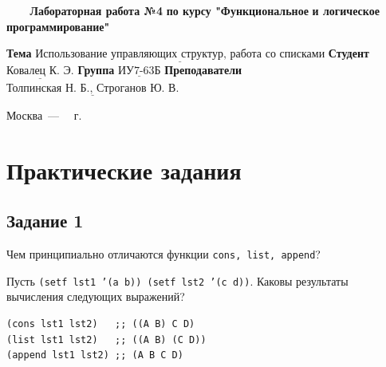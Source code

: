 \documentclass[a4paper,14pt, unknownkeysallowed]{extreport}
\begin{document}
\begin{titlepage}
	
	\begin{center}
		\noindent\begin{minipage}{1.3\textwidth}\centering
		\Large\textbf{   ~~~ Лабораторная работа №4}\newline
		\textbf{по курсу "Функциональное}\newline
		\textbf{и логическое программирование"}\newline\newline\newline
		\end{minipage}
	\end{center}
	
	\noindent\textbf{Тема} 			$\underline{\text{Использование управляющих структур, работа со списками}}$\newline\newline
	\noindent\textbf{Студент} 		$\underline{\text{Ковалец К. Э.}}$\newline\newline
	\noindent\textbf{Группа} 		$\underline{\text{ИУ7-63Б}}$\newline\newline
	\noindent\textbf{Преподаватели} $\underline{\text{Толпинская Н. Б., Строганов Ю. В.}}$\newline
	
	\begin{center}
		\vfill
		Москва~---~\the\year
		~г.
	\end{center}
	\restoregeometry
\end{titlepage}



\setcounter{page}{2}
\chapter{Практические задания}

\section{Задание 1}

Чем принципиально отличаются функции \texttt{cons, list, append}?

Пусть \texttt{(setf lst1 '(a b)) (setf lst2 '(c d))}.
Каковы результаты вычисления следующих выражений?

\begin{center}
\captionsetup{justification=raggedright,singlelinecheck=off}
\begin{lstlisting}[label=lst:parallel_processing,caption=Решение задания 1]
(cons lst1 lst2)   ;; ((A B) C D)
(list lst1 lst2)   ;; ((A B) (C D))
(append lst1 lst2) ;; (A B C D)
\end{lstlisting}
\end{center}
\end{document}
